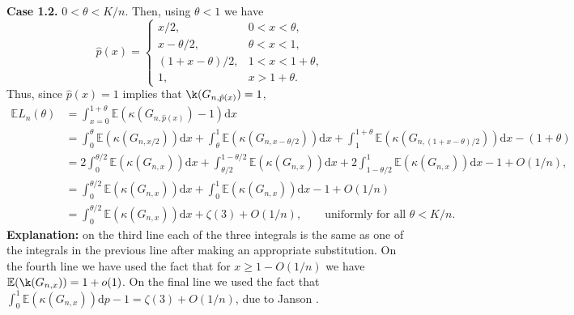 \documentclass[12pt]{article}
\newcommand{\1}{\textbf{1}}
\def\z{\zeta} \def\th{\theta} \def\TH{\Theta} \def\Th{\Theta}  \def\l{\lambda}
\def\dd{\text{d}}
\def\E{\mathbb{E}}
\begin{document}
\bigskip\noindent
\textbf{Case 1.2.} $0 < \theta < K/n$. Then, using $\th < 1$ we have
\[
\hat p(x) = \begin{cases}
x/2, & 0 < x < \theta, \\
x - \theta/2, & \theta < x < 1, \\
(1+x-\theta)/2, & 1 < x < 1 + \theta, \\
1, & x > 1+\theta.
\end{cases}
\]
Thus, since $\hat p(x)=1$ implies that $\k(G_{n,\hat p(x)})=1$,
\begin{align*}
\E L_n(\th) &= \int_{x=0}^{1+\th} \E(\kappa(G_{n,\hat p(x)})-1) \dd x\\
&=\int_0^\theta \E (\kappa(G_{n, x/2})) \dd x + \int_\theta^1 \E(\kappa(G_{n, 
x -\th/2})) \dd x + \int_1^{1+\theta} \E(\kappa(G_{n, (1+x-\th)/2})) \dd x-(1+\th)\\
            &= 2\int_0^{\theta/2} \E (\kappa(G_{n, x}))\dd x + \int_{\theta/2}^{1-\theta/2} \E (\kappa(G_{n, x}))\dd x + 2\int_{1-\theta/2}^{1} \E (\kappa(G_{n, x}))\dd x-1+O(1/n),\\
  &=  \int_0^{\theta/2} \E (\kappa(G_{n, x}))\dd x + \int_{0}^{1} \E (\kappa(G_{n, x}))\dd x -1+O(1/n)\\
&= \int_0^{\theta/2} \E (\kappa(G_{n, x}))\dd x + \z(3)+O(1/n),\qquad\text{uniformly for all }\th<K/n. 
\end{align*}
{\bf Explanation:} on the third line each of the three integrals is the same as one of the integrals in the previous line after making an appropriate substitution. On the fourth line we have used the fact that for $x \ge 1-O(1/n)$ we have $\E(\k(G_{n, x}))=1+o(1)$. On the final line we used the fact that $\int_{0}^{1} \E (\kappa(G_{n, x}))\dd p -1=\z(3)+O(1/n)$, due to Janson \cite{J1}.
\end{document}
